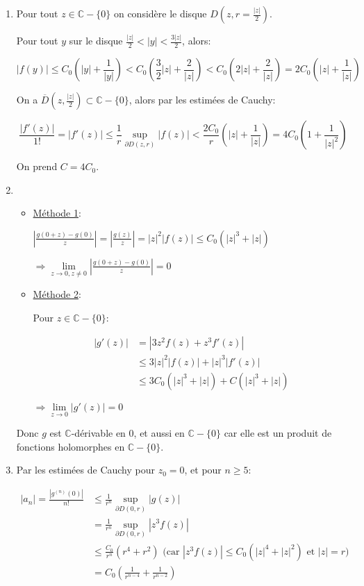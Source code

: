\documentclass[10pt,a4paper,oneside]{article}
\newenvironment{solution}[1][Solution]{\begin{trivlist}
\item[\hskip \labelsep {\bfseries #1}]}{\end{trivlist}}
\begin{document}
\begin{solution}

\begin{enumerate}
\item
Pour tout $z \in \mathbb{C} - \{ 0 \}$ on considère le disque $D(z,r = \frac{|z|}{2})$.

Pour tout $y$ sur le disque $\frac{|z|}{2} < |y| < \frac{3|z|}{2}$, alors:

\[ |f(y)| \leq C_0(|y| + \frac{1}{|y|}) < C_0(\frac{3}{2}|z| + \frac{2}{|z|}) < C_0(2|z| + \frac{2}{|z|}) = 2C_0(|z| + \frac{1}{|z|}) \]

On a $\overline{D}(z,\frac{|z|}{2}) \subset \mathbb{C} - \{ 0 \}$, alors par les estimées de Cauchy:

\[ \frac{|f'(z)|}{1!} = |f'(z)| \leq \frac{1}{r}\sup_{\partial D(z,r)}|f(z)| < \frac{2C_0}{r}(|z| + \frac{1}{|z|}) = 4C_0(1 + \frac{1}{|z|^2}) \]

On prend $C = 4C_0$.

\item
\begin{itemize}
\item
\underline{Méthode 1}:

$ | \frac{g(0 + z) - g(0)}{z} | = |\frac{g(z)}{z}| = |z|^2|f(z)| \leq C_0(|z|^3 + |z|) $

$ \Rightarrow \lim \limits_{z \to 0, z \neq 0} | \frac{g(0 + z) - g(0)}{z} | = 0$

\item
\underline{Méthode 2}:

Pour $z \in \mathbb{C} - \{ 0 \}$:

\begin{align}
|g'(z)| &= |3z^2f(z) + z^3f'(z)| \nonumber \\
&\leq 3|z|^2|f(z)| + |z|^3|f'(z)| \nonumber \\
&\leq 3C_0(|z|^3 + |z|) + C(|z|^3 + |z|)  \nonumber
\end{align}

$ \Rightarrow \lim \limits_{z \to 0} | g'(z) | = 0$
\end{itemize}

Donc $g$ est $\mathbb{C}$-dérivable en $0$, et aussi en $\mathbb{C} - \{ 0 \}$ car elle est un produit de fonctions holomorphes en $\mathbb{C} - \{ 0 \}$.

\item
Par les estimées de Cauchy pour $z_0 = 0$, et pour $n \geq 5$:

\begin{align}
|a_n| = \frac{|g^{(n)}(0)|}{n!} &\leq \frac{1}{r^n} \sup_{\partial D(0,r)}|g(z)| \nonumber \\
&= \frac{1}{r^n} \sup_{\partial D(0,r)}|z^3f(z)| \nonumber \\
& \leq \frac{C_0}{r^n}(r^4 + r^2) \text{ (car } |z^3f(z)| \leq C_0(|z|^4 + |z|^2) \text{ et } |z| = r) \nonumber \\
&= C_0(\frac{1}{r^{n - 4}} + \frac{1}{r^{n - 2}}) \nonumber
\end{align}


\end{enumerate}
\end{solution}
\end{document}
